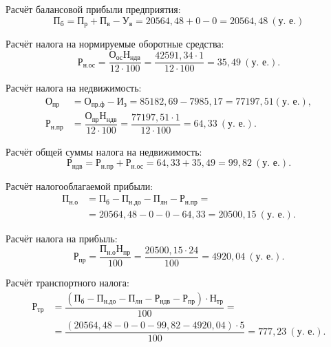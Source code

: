 Расчёт балансовой прибыли предприятия:
\begin{equation*}
  \text{П}_{\text{б}} = \text{П}_{\text{р}} + \text{П}_{\text{в}} - \text{У}_{\text{в}} =
  20564{,}48 + 0 - 0 =
  20564{,}48 \: (\text{у.~е.}) 
\end{equation*}

Расчёт налога на нормируемые оборотные средства:
\begin{equation*}
  \text{Р}_{\text{н.ос}} = 
  \dfrac{\text{О}_{\text{ос}} \text{Н}_{\text{ндв}}}{12 \cdot 100} =
  \dfrac{42591{,}34 \cdot 1}{12 \cdot 100} =
  35{,}49 \: (\text{у.~е.}).
\end{equation*}

Расчёт налога на недвижимость:
\begin{align*}
  \text{О}_{\text{пр}} &= \text{О}_{\text{пр.ф}} - \text{И}_{\text{з}} =
  85182{,}69 - 7985{,}17 = 77197{,}51 (\text{у.~е.}), \\
  \text{Р}_{\text{н.пр}} &= 
  \dfrac{\text{О}_{\text{пр}} \text{Н}_{\text{ндв}}}{12 \cdot 100} =
  \dfrac{77197{,}51 \cdot 1}{12 \cdot 100} = 
  64{,}33 \: (\text{у.~е.}).
\end{align*}

Расчёт общей суммы налога на недвижимость:
\begin{equation*}
  \text{Р}_{\text{ндв}} = \text{Р}_{\text{н.пр}} + \text{Р}_{\text{н.ос}} =
  64{,}33 + 35{,}49 =
  99{,}82 \: (\text{у.~е.}).
\end{equation*}

Расчёт налогооблагаемой прибыли:
\begin{align*}
  \text{П}_{\text{н.о}} &= \text{П}_{\text{б}} - 
  \text{П}_{\text{н.до}} - \text{П}_{\text{лн}}  - \text{Р}_{\text{н.пр}} = \\
  &= 20564{,}48 - 0 - 0 - 64{,}33 =
  20500{,}15 \: (\text{у.~е.}).
\end{align*}

Расчёт налога на прибыль:
\begin{equation*}
  \text{Р}_{\text{пр}} = 
  \dfrac{\text{П}_{\text{н.о}} \text{Н}_{\text{пр}}}{100} =
  \dfrac{20500{,}15 \cdot 24}{100} =
  4920{,}04 \: (\text{у.~е.}).
\end{equation*}

Расчёт транспортного налога:
\begin{align*}
  \text{Р}_{\text{тр}} &= 
  \dfrac{
    (\text{П}_{\text{б}} - \text{П}_{\text{н.до}} - \text{П}_{\text{лн}} - 
    \text{Р}_{\text{ндв}} - \text{Р}_{\text{пр}}) \cdot \text{Н}_{\text{тр}}
  }{100} = \\
  &= \dfrac{(20564{,}48 - 0 - 0 - 99{,}82 - 4920{,}04) \cdot 5}{100} =
  777{,}23 \: (\text{у.~е.}).
\end{align*}

